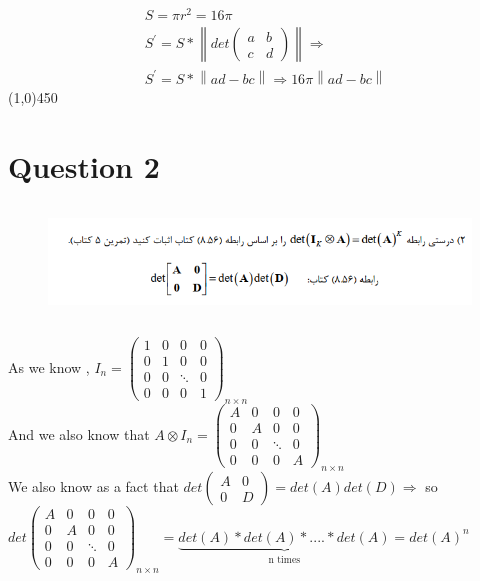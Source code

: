 \documentclass[a4paper,12pt]{article}
\begin{document}
\begin{align*}
	&S = \pi r^2 = 16\pi \\
	&S^\prime = S * \left\| det \begin{pmatrix} a & b\\c & d \end{pmatrix} \right\|  \Rightarrow \\
	&S^\prime = S *\left\| ad - bc \right\| \Rightarrow 16\pi \left\| ad - bc \right\|
\end{align*}
\line(1,0){450}
\newpage
\section {Question 2 }
\begin{figure}[h!]
	\centering
	\includegraphics*[height=3cm]{Q2}
\end{figure}

\begin{doublespace}
	As we know , $ I_n = \begin{pmatrix} 1 & 0 & 0 & 0\\0 & 1 & 0 & 0\\0 & 0 & \ddots & 0\\0 & 0 & 0 & 1 \end{pmatrix}_{n\times n}$ \\
	And we also know that $A \otimes I_n = \begin{pmatrix} A & 0 & 0 & 0\\0 & A & 0 & 0\\0 & 0 & \ddots & 0\\0 & 0 & 0 & A \end{pmatrix}_{n\times n}$\\
	We also know as a fact that $ det\begin{pmatrix} A & 0\\0 & D \end{pmatrix} = det(A)det(D) \Rightarrow $ so \\
	$det\begin{pmatrix} A & 0 & 0 & 0\\0 & A & 0 & 0\\0 & 0 & \ddots & 0\\0 & 0 & 0 & A \end{pmatrix}_{n\times n} =\underbrace{det(A)*det(A)*....*det(A)}_{\text{n times}} = det(A)^n $\\
\end{doublespace}
\end{document}
